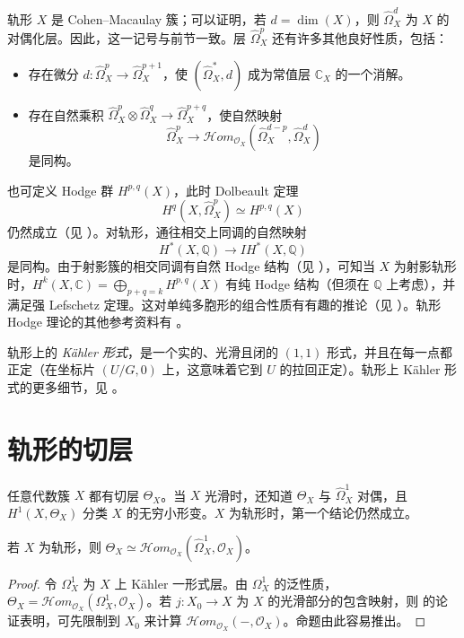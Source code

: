 轨形 $X$ 是 Cohen--Macaulay 簇；可以证明，若 $d=\dim(X)$，则 $\widehat\Omega_X^d$ 为 $X$ 的对偶化层。因此，这一记号与前节一致。层 $\widehat\Omega_X^p$ 还有许多其他良好性质，包括：
\begin{itemize}
\item 存在微分 $d:\widehat\Omega_X^p\to\widehat\Omega_X^{p+1}$，使 $(\widehat\Omega_X^*,d)$ 成为常值层 $\mathbb C_X$ 的一个消解。
\item 存在自然乘积 $\widehat\Omega_X^p\otimes\widehat\Omega_X^q\to\widehat\Omega_X^{p+q}$，使自然映射
\[
\widehat\Omega_X^p\longrightarrow\mathcal Hom_{\mathcal O_X}
(\widehat\Omega_X^{d-p},\widehat\Omega_X^d)
\]
是同构。
\end{itemize}
也可定义 Hodge 群 $H^{p,q}(X)$，此时 Dolbeault 定理
\[
H^q(X,\widehat\Omega_X^p)\simeq H^{p,q}(X)
\]
仍然成立（见 ）。对轨形，通往相交上同调的自然映射
\[
H^*(X,\mathbb Q)\longrightarrow IH^*(X,\mathbb Q)
\]
是同构。由于射影簇的相交同调有自然 Hodge 结构（见 ），可知当 $X$ 为射影轨形时，$H^k(X,\mathbb C)=\bigoplus_{p+q=k}H^{p,q}(X)$ 有纯 Hodge 结构（但须在 $\mathbb Q$ 上考虑），并满足强 Lefschetz 定理。这对单纯多胞形的组合性质有有趣的推论（见 ）。轨形 Hodge 理论的其他参考资料有 。

轨形上的 \emph{Kähler 形式}，是一个实的、光滑且闭的 $(1,1)$ 形式，并且在每一点都正定（在坐标片 $(U/G,0)$ 上，这意味着它到 $U$ 的拉回正定）。轨形上 Kähler 形式的更多细节，见 。

\section{轨形的切层}\label{sec:orbifold-tangent-sheaf}
任意代数簇 $X$ 都有切层 $\Theta_X$。当 $X$ 光滑时，还知道 $\Theta_X$ 与 $\widehat\Omega_X^1$ 对偶，且 $H^1(X,\Theta_X)$ 分类 $X$ 的无穷小形变。$X$ 为轨形时，第一个结论仍然成立。
\begin{proposition}\label{prop:orbifold-tangent-dual-zariski-forms}
若 $X$ 为轨形，则 $\Theta_X\simeq\mathcal Hom_{\mathcal O_X}(\widehat\Omega_X^1,\mathcal O_X)$。
\end{proposition}
\begin{proof}
令 $\Omega_X^1$ 为 $X$ 上 Kähler 一形式层。由 $\Omega_X^1$ 的泛性质，$\Theta_X=\mathcal Hom_{\mathcal O_X}(\Omega_X^1,\mathcal O_X)$。若 $j:X_0\to X$ 为 $X$ 的光滑部分的包含映射，则  的论证表明，可先限制到 $X_0$ 来计算 $\mathcal Hom_{\mathcal O_X}(-,\mathcal O_X)$。命题由此容易推出。
\end{proof}

